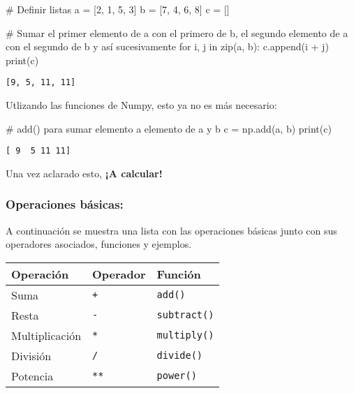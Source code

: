 \documentclass[
  letterpaper,
  DIV=11,
  numbers=noendperiod]{scrreprt}
\newenvironment{Shaded}{\begin{snugshade}}{\end{snugshade}}
\newcommand{\BuiltInTok}[1]{\textcolor[rgb]{0.00,0.23,0.31}{#1}}
\newcommand{\CommentTok}[1]{\textcolor[rgb]{0.37,0.37,0.37}{#1}}
\newcommand{\ControlFlowTok}[1]{\textcolor[rgb]{0.00,0.23,0.31}{#1}}
\newcommand{\DecValTok}[1]{\textcolor[rgb]{0.68,0.00,0.00}{#1}}
\newcommand{\KeywordTok}[1]{\textcolor[rgb]{0.00,0.23,0.31}{#1}}
\newcommand{\NormalTok}[1]{\textcolor[rgb]{0.00,0.23,0.31}{#1}}
\newcommand{\OperatorTok}[1]{\textcolor[rgb]{0.37,0.37,0.37}{#1}}
\begin{document}
\begin{Shaded}
\begin{Highlighting}[]
\CommentTok{\# Definir listas}
\NormalTok{a }\OperatorTok{=}\NormalTok{ [}\DecValTok{2}\NormalTok{, }\DecValTok{1}\NormalTok{, }\DecValTok{5}\NormalTok{, }\DecValTok{3}\NormalTok{]}
\NormalTok{b }\OperatorTok{=}\NormalTok{ [}\DecValTok{7}\NormalTok{, }\DecValTok{4}\NormalTok{, }\DecValTok{6}\NormalTok{, }\DecValTok{8}\NormalTok{]}
\NormalTok{c }\OperatorTok{=}\NormalTok{ []}

\CommentTok{\# Sumar el primer elemento de a con el primero de b, el segundo elemento de a con el segundo de b y así sucesivamente}
\ControlFlowTok{for}\NormalTok{ i, j }\KeywordTok{in} \BuiltInTok{zip}\NormalTok{(a, b):}
\NormalTok{  c.append(i }\OperatorTok{+}\NormalTok{ j)}
\BuiltInTok{print}\NormalTok{(c)}
\end{Highlighting}
\end{Shaded}

\begin{verbatim}
[9, 5, 11, 11]
\end{verbatim}

Utlizando las funciones de Numpy, esto ya no es más necesario:

\begin{Shaded}
\begin{Highlighting}[]
\CommentTok{\# add() para sumar elemento a elemento de a y b}
\NormalTok{c }\OperatorTok{=}\NormalTok{ np.add(a, b)}
\BuiltInTok{print}\NormalTok{(c)}
\end{Highlighting}
\end{Shaded}

\begin{verbatim}
[ 9  5 11 11]
\end{verbatim}

Una vez aclarado esto, \textbf{¡A calcular!}

\subsubsection{Operaciones básicas:}\label{operaciones-buxe1sicas}

A continuación se muestra una lista con las operaciones básicas junto
con sus operadores asociados, funciones y ejemplos.

\begin{longtable}[]{@{}lll@{}}
\toprule\noalign{}
Operación & Operador & Función \\
\midrule\noalign{}
\endhead
\bottomrule\noalign{}
\endlastfoot
Suma & \texttt{+} & \texttt{add()} \\
Resta & \texttt{-} & \texttt{subtract()} \\
Multiplicación & \texttt{*} & \texttt{multiply()} \\
División & \texttt{/} & \texttt{divide()} \\
Potencia & \texttt{**} & \texttt{power()} \\
\end{longtable}
\end{document}
